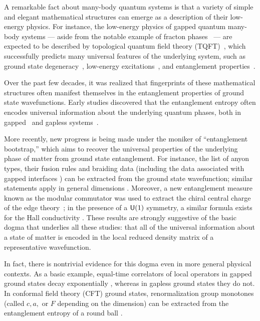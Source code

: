 \documentclass[12pt, nofootinbib]{article}
\theoremstyle{plain}
\theoremstyle{assumption}
\theoremstyle{definition}
\theoremstyle{plain}
\theoremstyle{plain}
\theoremstyle{plain}
\theoremstyle{plain}
\theoremstyle{plain}
\begin{document}
A remarkable fact about many-body quantum systems is that a variety of simple and elegant mathematical structures can emerge as a description of their low-energy physics. For instance, the low-energy physics of gapped quantum many-body systems --- aside from the notable example of fracton phases~\cite{Chamon:2004lew, Haah2011,nandkishore2019fractons,pretko2020fracton} ---
are expected to be described by topological quantum field theory (TQFT)~\cite{Witten1988}, which successfully predicts many universal features of the underlying system, such as ground state degeneracy~\cite{Wen1990}, low-energy excitations~\cite{Wilczek1982}, and entanglement properties~\cite{Kitaev2006,Levin2006}.

Over the past few decades, it was realized that fingerprints of these mathematical structures often manifest themselves in the entanglement properties of ground state wavefunctions. Early studies discovered that the entanglement entropy often encodes universal information about the underlying quantum phases, both in gapped~\cite{Kitaev2006,Levin2006} and gapless systems~\cite{Calabrese:2009qy,Ryu2006}.

More recently, new progress is being made under the moniker of ``entanglement bootstrap,'' which aims to recover the universal properties of the underlying phase of matter from ground state entanglement. For instance, the list of anyon types, their fusion rules \cite{shi2020fusion} and braiding data \cite{Shi:2019ngw}
(including the data associated with gapped interfaces \cite{Shi:2020rne}) can be extracted from the ground state wavefunction; similar statements apply in general dimensions \cite{knots-paper,Shi:2023kwr}. Moreover, a new entanglement measure known as the modular commutator was used to extract the chiral central charge of the edge theory~\cite{Kim2021}; in the presence of a $\textsf{U}(1)$ symmetry, a similar formula exists for the Hall conductivity \cite{Fan:2022ipl}. These results are strongly suggestive of the basic dogma that underlies all these studies: that all of the universal information about a state of matter is encoded in the local reduced density matrix of a representative wavefunction.

In fact, there is nontrivial evidence for this dogma even in more general physical contexts.  As a basic example, equal-time correlators of local operators in gapped ground states decay exponentially \cite{Hastings2005-decay-cor}, whereas in gapless ground states they do not. 
In conformal field theory (CFT) ground states, renormalization group monotones (called $c, a, $ or $F$ depending on the dimension) can be extracted from the entanglement entropy of a round ball \cite{Holzhey:1994we,Calabrese:2009qy,Myers:2010tj}. 
\end{document}
